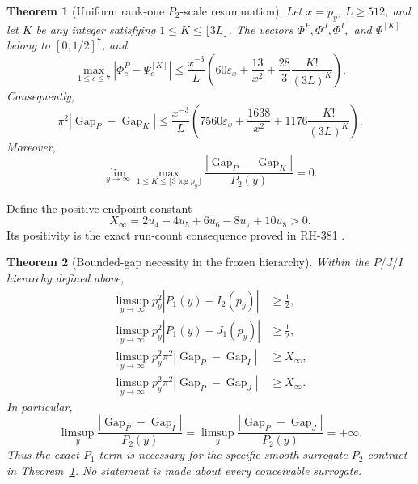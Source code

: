 \documentclass[11pt]{article}
\newtheorem{theorem}{Theorem}[section]
\theoremstyle{definition}
\theoremstyle{remark}
\newcommand{\eps}{\varepsilon}
\newcommand{\PhiP}{\Phi^{P}}
\newcommand{\PhiJ}{\Phi^{J}}
\newcommand{\PhiI}{\Phi^{I}}
\newcommand{\PsiK}{\Psi^{[K]}}
\newcommand{\GapP}{\operatorname{Gap}_{P}}
\newcommand{\GapJ}{\operatorname{Gap}_{J}}
\newcommand{\GapI}{\operatorname{Gap}_{I}}
\newcommand{\GapK}{\operatorname{Gap}_{K}}
\begin{document}
\begin{theorem}[Uniform rank-one $P_2$-scale resummation]
\label{thm:sufficiency}
Let $x=p_y$, $L\ge512$, and let $K$ be any integer satisfying
$1\le K\le\lfloor3L\rfloor$.  The vectors $\PhiP,\PhiJ,\PhiI,$ and
$\PsiK$ belong to $[0,1/2]^7$, and
\begin{equation}
 \max_{1\le c\le7}|\PhiP_c-\PsiK_c|
 \le\frac{x^{-3}}L\left(
 60\eps_x+\frac{13}{x^2}
 +\frac{28}{3}\frac{K!}{(3L)^K}\right).
 \label{eq:coordinate-master}
\end{equation}
Consequently,
\begin{equation}
 \boxed{
 \pi^2|\GapP-\GapK|
 \le\frac{x^{-3}}L\left(
 7560\eps_x+\frac{1638}{x^2}
 +1176\frac{K!}{(3L)^K}\right).}
 \label{eq:gap-master}
\end{equation}
Moreover,
\begin{equation}
 \lim_{y\to\infty}
 \max_{1\le K\le\lfloor3\log p_y\rfloor}
 \frac{|\GapP-\GapK|}{P_2(y)}=0.
 \label{eq:uniform-P2}
\end{equation}
\end{theorem}

Define the positive endpoint constant
\begin{equation}
 X_\infty=2u_4-4u_5+6u_6-8u_7+10u_8>0.
 \label{eq:X}
\end{equation}
Its positivity is the exact run-count consequence proved in RH-381
\cite{RH381}.

\begin{theorem}[Bounded-gap necessity in the frozen hierarchy]
\label{thm:necessity}
Within the $P/J/I$ hierarchy defined above,
\begin{align}
 \limsup_{y\to\infty}p_y^2|P_1(y)-I_2(p_y)|&\ge\frac12,
 \label{eq:scalar-I}\\
 \limsup_{y\to\infty}p_y^2|P_1(y)-J_1(p_y)|&\ge\frac12,
 \label{eq:scalar-J}\\
 \limsup_{y\to\infty}p_y^2\pi^2|\GapP-\GapI|&\ge X_\infty,
 \label{eq:gap-I-necessity}\\
 \limsup_{y\to\infty}p_y^2\pi^2|\GapP-\GapJ|&\ge X_\infty.
 \label{eq:gap-J-necessity}
\end{align}
In particular,
\begin{equation}
 \limsup_y\frac{|\GapP-\GapI|}{P_2(y)}
 =\limsup_y\frac{|\GapP-\GapJ|}{P_2(y)}=+\infty.
 \label{eq:ratio-divergence}
\end{equation}
Thus the exact $P_1$ term is necessary for the specific smooth-surrogate
$P_2$ contract in Theorem~\ref{thm:sufficiency}.  No statement is made
about every conceivable surrogate.
\end{theorem}
\end{document}
